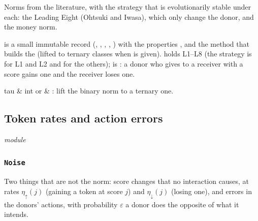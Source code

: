 \whatit
Norms from the literature, with the strategy that is evolutionarily stable under each: the Leading Eight (Ohtsuki and
Iwasa), which only change the donor, and the money norm.

\howit
{} is a small immutable record (, , , , ) with the
properties ,  and the method  that builds the  (lifted to ternary
classes when  is given).  holds L1--L8 (the strategy is  for L1 and L2 and
 for the others);  is : a donor who gives to a receiver with a
score gains one and the receiver loses one.

\paramsh
\begin{params}
tau & int or  & : lift the binary norm to a ternary one.\\
\end{params}

\exh
{}

\subsection{Token rates and action errors}\label{sec:noise}\emph{module} 

\subsubsection{\texttt{Noise}}

\whatit
Two things that are not the norm: score changes that no interaction causes, at rates $\eta_\uparrow(j)$ (gaining a token
at score $j$) and $\eta_\downarrow(j)$ (losing one), and errors in the donors' actions, with probability $\varepsilon$ a
donor does the opposite of what it intends.


